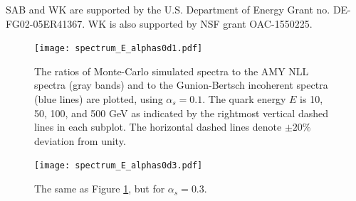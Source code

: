 \documentclass[aps, prc, reprint, amsmath, groupedaddress, nofootinbib]{revtex4-1}
\begin{document}
\begin{acknowledgments}
SAB and WK are supported by the U.S. Department of Energy Grant no. DE-FG02-05ER41367. WK is also supported by NSF grant OAC-1550225.
\end{acknowledgments}

\begin{appendices}
\begin{figure}
\texttt{[image: spectrum\_E\_alphas0d1.pdf]}
\caption{The ratios of Monte-Carlo simulated spectra to the AMY NLL spectra (gray bands) and to the Gunion-Bertsch incoherent spectra (blue lines) are plotted, using $\alpha_s = 0.1$. The quark energy $E$ is 10, 50, 100, and 500 GeV as indicated by the rightmost vertical dashed lines in each subplot. The horizontal dashed lines denote $\pm 20\%$ deviation from unity.}
\label{fig:spectra-alphas=0.1}
\end{figure}

\begin{figure}
\texttt{[image: spectrum\_E\_alphas0d3.pdf]}
\caption{The same as Figure \ref{fig:spectra-alphas=0.1}, but for $\alpha_s = 0.3$.}
\label{fig:spectra-alphas=0.3}
\end{figure}
\end{appendices}
\end{document}
